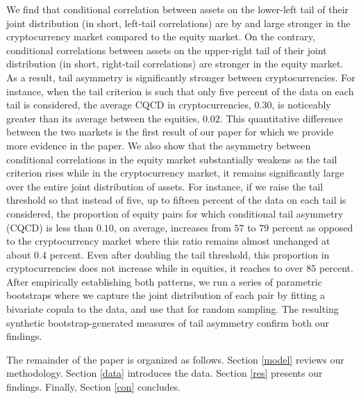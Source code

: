 \documentclass{article}
\begin{document}
We find that conditional correlation between assets on the lower-left tail of their joint distribution (in short, left-tail correlations) are by and large stronger in the cryptocurrency market compared to the equity market. On the contrary, conditional correlations between assets on the upper-right tail of their joint distribution (in short, right-tail correlations) are stronger in the equity market. As a result, tail asymmetry is significantly stronger between cryptocurrencies. For instance, when the tail criterion is such that only five percent of the data on each tail is considered, the average CQCD in cryptocurrencies, $0.30$, is noticeably greater than its average between the equities, $0.02$. This quantitative difference between the two markets is the first result of our paper for which we provide more evidence in the paper. We also show that the asymmetry between conditional correlations in the equity market substantially weakens as the tail criterion rises while in the cryptocurrency market, it remains significantly large over the entire joint distribution of assets. For instance, if we raise the tail threshold so that instead of five, up to fifteen percent of the data on each tail is considered, the proportion of equity pairs for which conditional tail asymmetry (CQCD) is less than $0.10$, on average, increases from $57$ to $79$ percent as opposed to the cryptocurrency market where this ratio remains almost unchanged at about $0.4$ percent. Even after doubling the tail threshold, this proportion in cryptocurrencies does not increase while in equities, it reaches to over $85$ percent. After empirically establishing both patterns, we run a series of parametric bootstraps where we capture the joint distribution of each pair by fitting a bivariate copula to the data, and use that for random sampling. The resulting synthetic bootstrap-generated measures of tail asymmetry confirm both our findings. \par 
The remainder of the paper is organized as follows. Section \ref{model} reviews our methodology. Section \ref{data} introduces the data. Section \ref{res} presents our findings. Finally, Section \ref{con} concludes.
\end{document}
